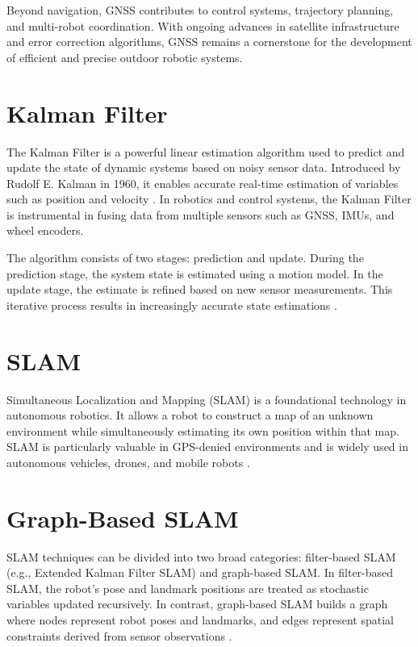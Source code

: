 \par
Beyond navigation, GNSS contributes to control systems, trajectory planning, and multi-robot coordination. With ongoing advances in satellite infrastructure and error correction algorithms, GNSS remains a cornerstone for the development of efficient and precise outdoor robotic systems.

\section{Kalman Filter}
The Kalman Filter is a powerful linear estimation algorithm used to predict and update the state of dynamic systems based on noisy sensor data. Introduced by Rudolf E. Kalman in 1960, it enables accurate real-time estimation of variables such as position and velocity \cite{kalman1960new}. In robotics and control systems, the Kalman Filter is instrumental in fusing data from multiple sensors such as GNSS, IMUs, and wheel encoders.

\par
The algorithm consists of two stages: prediction and update. During the prediction stage, the system state is estimated using a motion model. In the update stage, the estimate is refined based on new sensor measurements. This iterative process results in increasingly accurate state estimations \cite{welch2006kalman}.

\section{SLAM}
Simultaneous Localization and Mapping (SLAM) is a foundational technology in autonomous robotics. It allows a robot to construct a map of an unknown environment while simultaneously estimating its own position within that map. SLAM is particularly valuable in GPS-denied environments and is widely used in autonomous vehicles, drones, and mobile robots \cite{cadena2016past}.

\section{Graph-Based SLAM}
SLAM techniques can be divided into two broad categories: filter-based SLAM (e.g., Extended Kalman Filter SLAM) and graph-based SLAM. In filter-based SLAM, the robot's pose and landmark positions are treated as stochastic variables updated recursively. In contrast, graph-based SLAM builds a graph where nodes represent robot poses and landmarks, and edges represent spatial constraints derived from sensor observations \cite{thrun2005probabilistic}.


